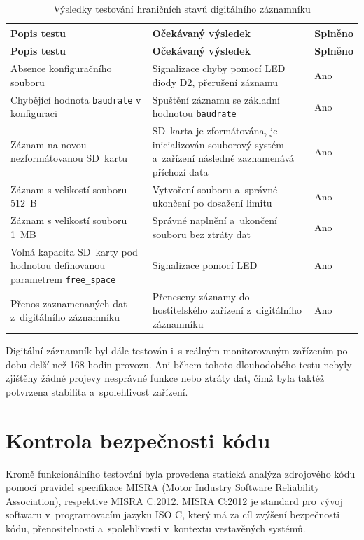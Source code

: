 \begin{longtable}{|p{6cm}|p{5cm}|p{2.5cm}|}
    \caption{Výsledky testování hraničních stavů digitálního záznamníku}
    \label{tab:test-extremes} \\
    \hline
    \textbf{Popis testu} & \textbf{Očekávaný výsledek} & \textbf{Splněno} \\
    \hline
    \endfirsthead

    \hline
    \textbf{Popis testu} & \textbf{Očekávaný výsledek} & \textbf{Splněno} \\
    \hline
    \endhead

    \hline
    \endfoot

    \hline
    \endlastfoot

    Absence konfiguračního souboru & Signalizace chyby pomocí LED diody D2, přerušení záznamu & Ano \\
    \hline
    Chybějící hodnota \texttt{baudrate} v konfiguraci & Spuštění záznamu se základní hodnotou \texttt{baudrate} & Ano \\
    \hline
    Záznam na novou nezformátovanou SD~kartu & SD~karta je zformátována, je inicializován souborový systém a~zařízení následně zaznamenává příchozí data & Ano \\
    \hline
    Záznam s velikostí souboru 512~B & Vytvoření souboru a~správné ukončení po dosažení limitu & Ano \\
    \hline
    Záznam s velikostí souboru 1~MB & Správné naplnění a~ukončení souboru bez ztráty dat & Ano \\
    \hline
    Volná kapacita SD~karty pod hodnotou definovanou parametrem \texttt{free\_space} & Signalizace pomocí LED & Ano \\
    \hline
    Přenos zaznamenaných dat z~digitálního záznamníku & Přeneseny záznamy do hostitelského zařízení z~digitálního záznamníku & Ano \\
    \hline
\end{longtable}

Digitální záznamník byl dále testován i~s reálným monitorovaným zařízením po dobu delší než 168 hodin provozu. Ani během tohoto dlouhodobého testu nebyly zjištěny žádné projevy nesprávné funkce nebo ztráty dat, čímž byla taktéž potvrzena stabilita a~spolehlivost zařízení.

\section{Kontrola bezpečnosti kódu}
Kromě funkcionálního testování byla provedena statická analýza zdrojového kódu pomocí pravidel specifikace MISRA (Motor Industry Software Reliability Association), respektive MISRA C:2012. MISRA C:2012 je standard pro vývoj softwaru v~programovacím jazyku ISO C, který má za cíl zvýšení bezpečnosti kódu, přenositelnosti a~spolehlivosti v~kontextu vestavěných systémů.

